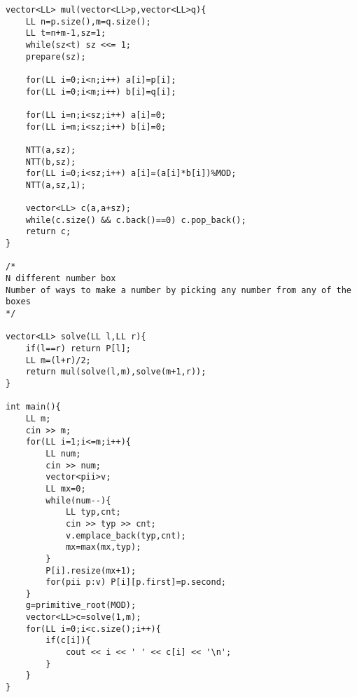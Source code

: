 \documentclass[10pt,a4paper,onesided]{article}
\begin{document}
\begin{multicols*}{3}
\begin{lstlisting}
vector<LL> mul(vector<LL>p,vector<LL>q){
    LL n=p.size(),m=q.size();
    LL t=n+m-1,sz=1;
    while(sz<t) sz <<= 1;
    prepare(sz);

    for(LL i=0;i<n;i++) a[i]=p[i];
    for(LL i=0;i<m;i++) b[i]=q[i];

    for(LL i=n;i<sz;i++) a[i]=0;
    for(LL i=m;i<sz;i++) b[i]=0;

    NTT(a,sz);
    NTT(b,sz);
    for(LL i=0;i<sz;i++) a[i]=(a[i]*b[i])%MOD;
    NTT(a,sz,1);

    vector<LL> c(a,a+sz);
    while(c.size() && c.back()==0) c.pop_back();
    return c;
}

/*
N different number box
Number of ways to make a number by picking any number from any of the boxes
*/

vector<LL> solve(LL l,LL r){
    if(l==r) return P[l];
    LL m=(l+r)/2;
    return mul(solve(l,m),solve(m+1,r));
}

int main(){
    LL m;
    cin >> m;
    for(LL i=1;i<=m;i++){
        LL num;
        cin >> num;
        vector<pii>v;
        LL mx=0;
        while(num--){
            LL typ,cnt;
            cin >> typ >> cnt;
            v.emplace_back(typ,cnt);
            mx=max(mx,typ);
        }
        P[i].resize(mx+1);
        for(pii p:v) P[i][p.first]=p.second;
    }
    g=primitive_root(MOD);
    vector<LL>c=solve(1,m);
    for(LL i=0;i<c.size();i++){
        if(c[i]){
            cout << i << ' ' << c[i] << '\n';
        }
    }
}
\end{lstlisting}

\end{multicols*}
\end{document}
